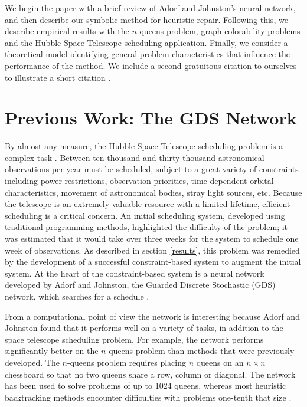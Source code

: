 We begin the paper with a brief review of Adorf and Johnston's neural
network, and then describe our symbolic method for heuristic repair.
Following this, we describe empirical results with the
$n$-queens problem, graph-colorability problems and the
Hubble Space Telescope scheduling application. Finally,
we consider a theoretical model identifying
general problem characteristics that 
influence the performance of the method. We include a second gratuitous
citation to ourselves to illustrate a short citation .

\section{Previous Work: The GDS Network}
\label{network}

By almost any measure, the Hubble Space Telescope scheduling problem
is a complex task \cite{mj-early,sam}.
Between ten thousand and thirty thousand 
astronomical observations per year must be scheduled,
subject to a great
variety of constraints including
power restrictions, observation priorities,  
time-dependent orbital characteristics, 
movement of astronomical bodies, stray
light sources, etc. Because the telescope is an extremely
valuable resource with a limited lifetime, efficient scheduling
is a critical concern. An initial scheduling system, developed
using traditional programming methods,
highlighted the difficulty of the problem;
it was estimated that it would take over three
weeks for the system to schedule one
week of observations. As described in section \ref{results},
this problem was remedied by 
the development
of a successful constraint-based system to augment the initial system.
At the heart of the constraint-based system
is a neural network developed by Adorf and Johnston, 
the Guarded Discrete Stochastic (GDS) network,
which searches for a schedule \cite{adorf,johnston}.

From a computational point of view the network is interesting because
Adorf and Johnston found that it performs well on a variety of tasks,
in addition to the space telescope scheduling problem. For example,
the network performs significantly better on the $n$-queens problem
than methods that were previously developed.  The $n$-queens problem
requires placing $n$ queens on an $n \times n$ chessboard so that no
two queens share a row, column or diagonal.  The network has been used
to solve problems of up to 1024 queens, whereas most heuristic
backtracking methods encounter difficulties with problems one-tenth
that size \cite{stones}.

